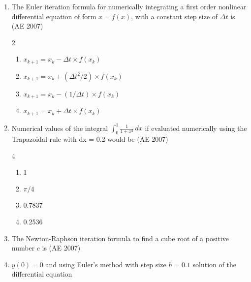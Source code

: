 \begin{enumerate}[label=\thesubsection.\arabic*,ref=\thesubsection.\theenumi]
    \item The Euler iteration formula for numerically integrating a first order nonlinear differential equation of form $x = f(x)$, with a constant step size of $\Delta t$ is 
	    \hfill (AE 2007)
    \begin{multicols}{2}
    \begin{enumerate}
        \item $x_{k+1} = x_k - \Delta t \times f(x_k)$ 
        \item $x_{k+1} = x_k + \left( \Delta t^2 / 2 \right) \times f(x_k)$ 
        \item $x_{k+1} = x_k - (1 / \Delta t) \times f(x_k)$ 
        \item $x_{k+1} = x_k + \Delta t \times f(x_k)$
    \end{enumerate}
    \end{multicols}
    \item Numerical values of the integral 
    $\int_{0}^{1} \frac{1}{1 + x^2}\,dx$ if evaluated numerically using the Trapazoidal rule with dx = 0.2 would be
    \hfill (AE 2007)
    \begin{multicols}{4}
\begin{enumerate}
        \item 1
        \item $\pi/4$
        \item 0.7837
        \item 0.2536
    \end{enumerate}
    \end{multicols}
    \item The Newton-Raphson iteration formula to find a cube root of a positive number $c$ is
    \hfill (AE 2007)
\begin{enumerate}
    \end{enumerate}
\item 
$y(0) = 0$ and using Euler's method with step size $h = 0.1$ solution of the differential equation

\end{enumerate}
